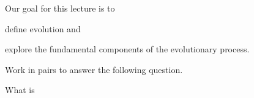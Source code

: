 \documentclass[t]{beamer}
\begin{document}
%
%
%
%


\begin{frame}{Our goal for this lecture is to}
	
	\hangpara define evolution and
	
	\hangpara explore the fundamental components of the evolutionary process.

\end{frame}

%

%
\begin{frame}[t,plain]{Work in pairs to answer the following question.}
	\vspace{2ex}
	
	\hangpara What is  \onslide<2->\\[2\baselineskip]
	
\end{frame}
\end{document}
